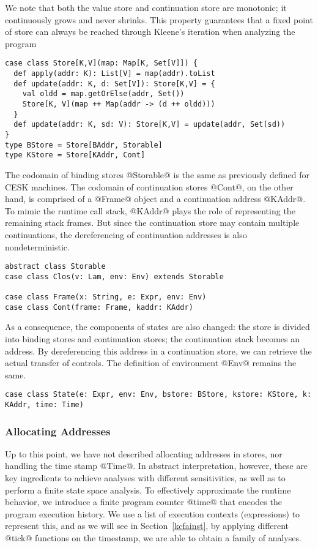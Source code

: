 \documentclass[acmsmall,review,anonymous]{acmart}\settopmatter{printfolios=true,printccs=false,printacmref=false}
\begin{document}
We note that both the value store and continuation store are monotonic;
it continuously grows and never shrinks. This property guarantees that
a fixed point of store can always be reached through Kleene's
iteration when analyzing the program

\begin{lstlisting}
case class Store[K,V](map: Map[K, Set[V]]) {
  def apply(addr: K): List[V] = map(addr).toList
  def update(addr: K, d: Set[V]): Store[K,V] = {
    val oldd = map.getOrElse(addr, Set())
    Store[K, V](map ++ Map(addr -> (d ++ oldd)))
  }
  def update(addr: K, sd: V): Store[K,V] = update(addr, Set(sd))
}
type BStore = Store[BAddr, Storable]
type KStore = Store[KAddr, Cont]
\end{lstlisting}

The codomain of binding stores @Storable@ is the same as previously defined for CESK machines.
The codomain of continuation stores @Cont@, on the other hand, is comprised of
a @Frame@ object and a continuation address @KAddr@.
To mimic the runtime call stack, @KAddr@ plays the role of
representing the remaining stack frames.
But since the continuation store may contain multiple continuations,
the dereferencing of continuation addresses is also nondeterministic.

\begin{lstlisting}
abstract class Storable
case class Clos(v: Lam, env: Env) extends Storable

case class Frame(x: String, e: Expr, env: Env)
case class Cont(frame: Frame, kaddr: KAddr)
\end{lstlisting}

As a consequence, the components of states are also changed:
the store is divided into binding stores and continuation stores;
the continuation stack becomes an address.
By dereferencing this address in a continuation store, we can retrieve the
actual transfer of controls. The definition of environment @Env@
remains the same.

\begin{lstlisting}
case class State(e: Expr, env: Env, bstore: BStore, kstore: KStore, k: KAddr, time: Time)
\end{lstlisting}

\subsubsection{Allocating Addresses}
Up to this point, we have not described allocating addresses in stores,
nor handling the time stamp @Time@.
In abstract interpretation, however, these are key ingredients to achieve
analyses with different sensitivities, as well as to perform a finite
state space analysis\cite{Gilray:2016:ACP:2951913.2951936}.
To effectively approximate the runtime behavior, we introduce a finite
program counter @time@ that encodes the program execution history.
We use a list of execution contexts (expressions) to represent this, and
as we will see in Section~\ref{kcfainst}, by applying different @tick@
functions on the timestamp, we are able to obtain a family of analyses.
\end{document}
